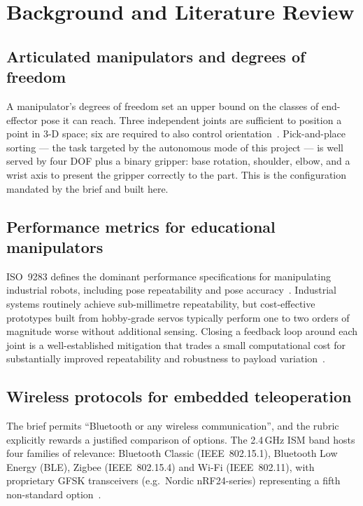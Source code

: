 \section{Background and Literature Review}
\label{sec:literature}

\subsection{Articulated manipulators and degrees of freedom}
A manipulator's degrees of freedom set an upper bound on the classes
of end-effector pose it can reach. Three independent joints are
sufficient to position a point in 3-D space; six are required to also
control orientation~\cite{siciliano2009}. Pick-and-place sorting --- the
task targeted by the autonomous mode of this project --- is well served
by four DOF plus a binary gripper: base rotation, shoulder, elbow, and
a wrist axis to present the gripper correctly to the part. This is
the configuration mandated by the brief and built here.

\subsection{Performance metrics for educational manipulators}
ISO~9283 defines the dominant performance specifications for
manipulating industrial robots, including pose
repeatability and pose accuracy~\cite{iso9283}. Industrial systems
routinely achieve sub-millimetre repeatability, but cost-effective
prototypes built from hobby-grade servos typically perform one to two
orders of magnitude worse without additional sensing. Closing a feedback
loop around each joint is a well-established mitigation that trades a
small computational cost for substantially improved repeatability and
robustness to payload variation~\cite{spong2020,siciliano2009}.

\subsection{Wireless protocols for embedded teleoperation}
The brief permits ``Bluetooth or any wireless communication'', and
the rubric explicitly rewards a justified comparison of options. The
2.4\,GHz ISM band hosts four families of relevance:
Bluetooth Classic (IEEE~802.15.1), Bluetooth Low Energy (BLE), Zigbee
(IEEE~802.15.4) and Wi-Fi (IEEE~802.11), with proprietary GFSK
transceivers (e.g.\ Nordic nRF24-series) representing a fifth
non-standard option~\cite{ieee802151,gomez2012,ieee802154,baker2005}.


